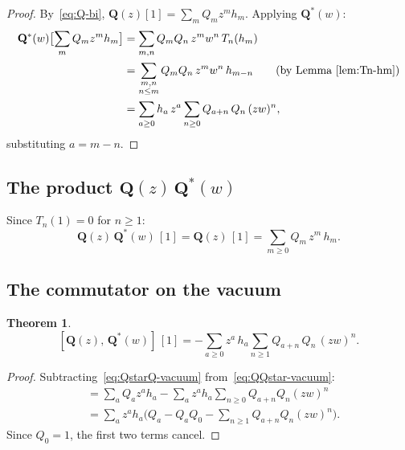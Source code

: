 \documentclass[11pt]{article}
\theoremstyle{plain}
\newtheorem{theorem}{Theorem}
\theoremstyle{definition}
\begin{document}
\begin{proof}
By~\eqref{eq:Q-bi},
$\mathbf{Q}(z)[1] = \sum_m Q_m z^m h_m$.  Applying $\mathbf{Q}^*(w)$:
\begin{align*}
  \mathbf{Q}^*(w)\bigl[\sum_m Q_m z^m h_m\bigr]
  &= \sum_{m,n} Q_m Q_n\, z^m w^n\, T_n(h_m) \\
  &= \sum_{\substack{m,n \\ n \leq m}} Q_m Q_n\, z^m w^n\, h_{m-n}
    \qquad\text{(by Lemma~\ref{lem:Tn-hm})} \\
  &= \sum_{a \geq 0} h_a\, z^a \sum_{n \geq 0}
    Q_{a+n}\, Q_n\, (zw)^n,
\end{align*}
substituting $a = m - n$.
\end{proof}


\subsection{The product $\mathbf{Q}(z)\,\mathbf{Q}^*(w)$}

Since $T_n(1) = 0$ for $n \geq 1$:
\begin{equation}\label{eq:QQstar-vacuum}
  \mathbf{Q}(z)\,\mathbf{Q}^*(w)\,[1]
  = \mathbf{Q}(z)\,[1]
  = \sum_{m \geq 0} Q_m\, z^m\, h_m.
\end{equation}


\subsection{The commutator on the vacuum}

\begin{theorem}\label{thm:commutator-vacuum}
\begin{equation}\label{eq:comm-vacuum}
  [\mathbf{Q}(z),\, \mathbf{Q}^*(w)]\,[1]
  = -\sum_{a \geq 0} z^a\, h_a
    \sum_{n \geq 1} Q_{a+n}\, Q_n\, (zw)^n.
\end{equation}
\end{theorem}

\begin{proof}
Subtracting~\eqref{eq:QstarQ-vacuum}
from~\eqref{eq:QQstar-vacuum}:
\begin{align*}
  [\mathbf{Q}(z), \mathbf{Q}^*(w)][1]
  &= \sum_a Q_a z^a h_a
    - \sum_a z^a h_a \sum_{n \geq 0} Q_{a+n} Q_n (zw)^n \\
  &= \sum_a z^a h_a \bigl(Q_a - Q_a Q_0
    - \textstyle\sum_{n \geq 1} Q_{a+n} Q_n (zw)^n\bigr).
\end{align*}
Since $Q_0 = 1$, the first two terms cancel.
\end{proof}
\end{document}

